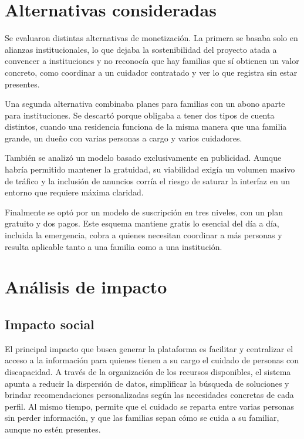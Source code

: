 \section{Alternativas consideradas}

Se evaluaron distintas alternativas de monetización. La primera se basaba solo en alianzas institucionales, lo que dejaba la sostenibilidad del proyecto atada a convencer a instituciones y no reconocía que hay familias que sí obtienen un valor concreto, como coordinar a un cuidador contratado y ver lo que registra sin estar presentes.

Una segunda alternativa combinaba planes para familias con un abono aparte para instituciones. Se descartó porque obligaba a tener dos tipos de cuenta distintos, cuando una residencia funciona de la misma manera que una familia grande, un dueño con varias personas a cargo y varios cuidadores.

También se analizó un modelo basado exclusivamente en publicidad. Aunque habría permitido mantener la gratuidad, su viabilidad exigía un volumen masivo de tráfico y la inclusión de anuncios corría el riesgo de saturar la interfaz en un entorno que requiere máxima claridad.

Finalmente se optó por un modelo de suscripción en tres niveles, con un plan gratuito y dos pagos. Este esquema mantiene gratis lo esencial del día a día, incluida la emergencia, cobra a quienes necesitan coordinar a más personas y resulta aplicable tanto a una familia como a una institución.

\section{Análisis de impacto}

\subsection{Impacto social}

El principal impacto que busca generar la plataforma es facilitar y centralizar el acceso a la información para quienes tienen a su cargo el cuidado de personas con discapacidad. A través de la organización de los recursos disponibles, el sistema apunta a reducir la dispersión de datos, simplificar la búsqueda de soluciones y brindar recomendaciones personalizadas según las necesidades concretas de cada perfil. Al mismo tiempo, permite que el cuidado se reparta entre varias personas sin perder información, y que las familias sepan cómo se cuida a su familiar, aunque no estén presentes.

